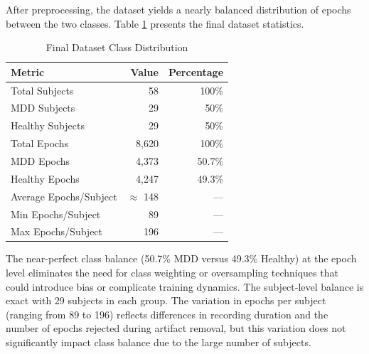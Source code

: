 After preprocessing, the dataset yields a nearly balanced distribution of epochs between the two classes. Table \ref{tab:class_distribution} presents the final dataset statistics.

\begin{table}[H]
    \centering
    \small
    \caption{Final Dataset Class Distribution}
    \label{tab:class_distribution}
    \begin{tabularx}{\textwidth}{|X|r|r|}
        \hline
        \textbf{Metric} & \textbf{Value} & \textbf{Percentage} \\
        \hline
        Total Subjects & 58 & 100\% \\
        \hline
        MDD Subjects & 29 & 50\% \\
        \hline
        Healthy Subjects & 29 & 50\% \\
        \hline
        Total Epochs & 8,620 & 100\% \\
        \hline
        MDD Epochs & 4,373 & 50.7\% \\
        \hline
        Healthy Epochs & 4,247 & 49.3\% \\
        \hline
        Average Epochs/Subject & $\approx$ 148 & --- \\
        \hline
        Min Epochs/Subject & 89 & --- \\
        \hline
        Max Epochs/Subject & 196 & --- \\
        \hline
    \end{tabularx}
\end{table}

The near-perfect class balance (50.7\% MDD versus 49.3\% Healthy) at the epoch level eliminates the need for class weighting or oversampling techniques that could introduce bias or complicate training dynamics. The subject-level balance is exact with 29 subjects in each group. The variation in epochs per subject (ranging from 89 to 196) reflects differences in recording duration and the number of epochs rejected during artifact removal, but this variation does not significantly impact class balance due to the large number of subjects.

